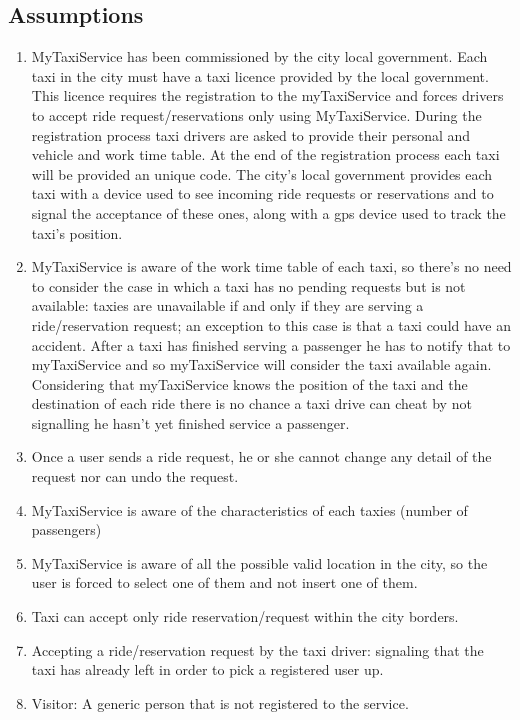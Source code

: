 \documentclass[11pt]{article} %
\begin{document}
    \subsection{Assumptions}
    \begin{enumerate}
        \item MyTaxiService has been commissioned by the city local government.
        Each taxi in the city must have a taxi licence provided by the local government. This licence requires the registration to the myTaxiService
        and forces drivers to accept ride request/reservations only using MyTaxiService.
        During the registration process taxi drivers are asked to provide their personal and vehicle and work time table.
        At the end of the registration process each taxi will be provided an unique code.
        The city's local government provides each taxi with a device used to see incoming ride requests or reservations and
        to signal the acceptance of these ones, along with a gps device used to track the taxi's position.

        \item MyTaxiService is aware of the work time table of each taxi, so there's no need to consider
        the case in which a taxi has no pending requests but is not available: taxies are unavailable
        if and only if they are serving a ride/reservation request; an exception to this case is that a taxi could have an accident.  After a taxi has finished serving a passenger he has to notify that
        to myTaxiService and so myTaxiService will consider the taxi available again. Considering that myTaxiService knows the position
        of the taxi and the destination of each ride there is no chance a taxi drive can cheat by not signalling he hasn't yet finished service a passenger.

        \item Once a user sends a ride request, he or she cannot change any detail of the request nor can
          undo the request.

        \item MyTaxiService is aware of the characteristics of each taxies (number of passengers)

        \item MyTaxiService is aware of all the possible valid location in the city, so the user is forced to select one of them and not insert one of them.

        \item Taxi can accept only ride reservation/request within the city borders.

        \item Accepting a ride/reservation request by the taxi driver: signaling that the taxi has already left in order to pick a registered user up.

        \item Visitor: A generic person that is not registered to the service.
    \end{enumerate}
\end{document}
